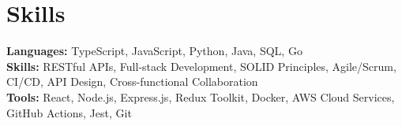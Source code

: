 \documentclass[11pt]{article}
\begin{document}
\vspace{-18.5pt}

\section*{Skills}
\textbf{Languages:} TypeScript, JavaScript, Python, Java, SQL, Go\\
\textbf{Skills:} RESTful APIs, Full-stack Development, SOLID Principles, Agile/Scrum, CI/CD, API Design, Cross-functional Collaboration\\
\textbf{Tools:} React, Node.js, Express.js, Redux Toolkit, Docker, AWS Cloud Services, GitHub Actions, Jest, Git

\vspace{-6.5pt}
\end{document}
